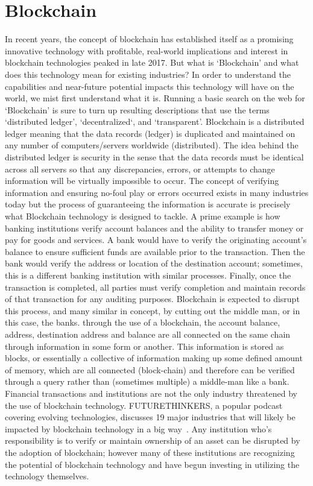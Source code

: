\section{Blockchain}
In recent years, the concept of blockchain has established itself as a promising innovative technology with profitable, real-world implications and interest in blockchain technologies peaked in late 2017. But what is `Blockchain' and what does this technology mean for existing industries? In order to understand the capabilities and near-future potential impacts this technology will have on the world, we mist first understand what it is. Running a basic search on the web for `Blockchain' is sure to turn up resulting descriptions that use the terms `distributed ledger', `decentralized`, and `transparent'. Blockchain is a distributed ledger meaning that the data records (ledger) is duplicated and maintained on any number of computers/servers worldwide (distributed). The idea behind the distributed ledger is security in the sense that the data records must be identical across all servers so that any discrepancies, errors, or attempts to change information will be virtually impossible to occur. The concept of verifying information and ensuring no-foul play or errors occurred exists in many industries today but the process of guaranteeing the information is accurate is precisely what Blockchain technology is designed to tackle. A prime example is how banking institutions verify account balances and the ability to transfer money or pay for goods and services. A bank would have to verify the originating account's balance to ensure sufficient funds are available prior to the transaction. Then the bank would verify the address or location of the destination account; sometimes, this is a different banking institution with similar processes. Finally, once the transaction is completed, all parties must verify completion and maintain records of that transaction for any auditing purposes. Blockchain is expected to disrupt this process, and many similar in concept, by cutting out the middle man, or in this case, the banks. through the use of a blockchain, the account balance, address, destination address and balance are all connected on the same chain through information in some form or another. This information is stored as blocks, or essentially a collective of information making up some defined amount of memory, which are all connected (block-chain) and therefore can be verified through a query rather than (sometimes multiple) a middle-man like a bank. Financial transactions and institutions are not the only industry threatened by the use of blockchain technology. FUTURETHINKERS, a popular podcast covering evolving technologies, discusses 19 major industries that will likely be impacted by blockchain technology in a big way~\cite{FutureThinkers}. Any institution who's responsibility is to verify or maintain ownership of an asset can be disrupted by the adoption of blockchain; however many of these institutions are recognizing the potential of blockchain technology and have begun investing in utilizing the technology themselves. 

